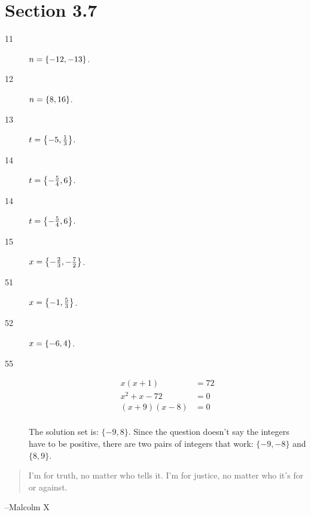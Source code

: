 \documentclass[letterpaper]{exam}
\begin{document}
  \ifprintanswers{}
    \section{Section 3.7} %
    
    \begin{description}
      \item[11] $n = \cbr{ -12, -13 }$.

      \item[12] $n = \cbr{ 8, 16 }$.

      \item[13] $t = \cbr{ -5, \frac{1}{3} }$.

      \item[14] $t = \cbr{ - \frac{5}{4}, 6 }$.

      \item[14] $t = \cbr{ - \frac{5}{4}, 6 }$.

      \item[15] $x = \cbr{ - \frac{2}{3}, - \frac{7}{2} }$.

      \item[51] $x = \cbr{ -1, \frac{5}{3} }$.

      \item[52] $x = \cbr{-6, 4}$.

      \item[55]
        \begin{align*}
          x(x + 1)       & = 72 \\
          x^2 + x - 72   & = 0 \\
          (x + 9)(x - 8) & = 0 \\
        \end{align*}

        The solution set is: $\{-9, 8\}$.  Since the question doesn't say the
        integers have to be positive, there are two pairs of integers that work:
        $\{-9, -8\}$ and $\{8, 9\}$.

    \end{description}

  \fi
  \ifprintanswers{}
  \else
    \vspace{9 cm}
    \begin{quote}
      \begin{em}
        I'm for truth, no matter who tells it. I'm for justice, no matter who it's for or against.
      \end{em}
    \end{quote}
    \hspace{2 cm}--Malcolm X
  \fi
\end{document}
